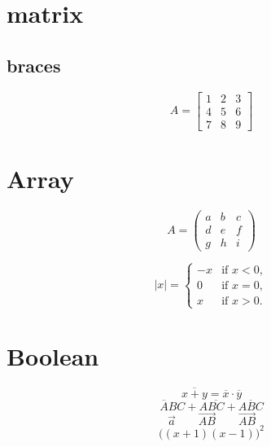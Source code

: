 \documentclass[12pt]{article}
\begin{document}
\section{matrix}
\subsection{braces}
\begin{equation*}
A = \begin{bmatrix}
1&2&3\\
4&5&6\\
7&8&9
\end{bmatrix}
\end{equation*}
\section{Array}
$$
A = 
\left( 
\begin{array}{ccc}       %
 a & b & c\\ 
d & e & f\\ 
g & h & i 
\end{array} 
\right) 
$$

\begin{equation*} 
|x| = \left\{
\begin{array}{rl} 
-x & \text{if } x < 0,\\
 0 & \text{if } x = 0,\\
 x & \text{if } x > 0. 
\end{array} \right. 
\end{equation*} 
\section{Boolean}
$$\overline{x+y} = \overline{x}\cdot\overline{y}$$
$$\overline{A}BC + A\overline{BC} + \overline{ABC}$$
$$\vec{a} \qquad \vec{AB} \qquad \overrightarrow{AB}$$
$$\Big((x+1)(x-1)\Big)^{2}$$
\end{document}

